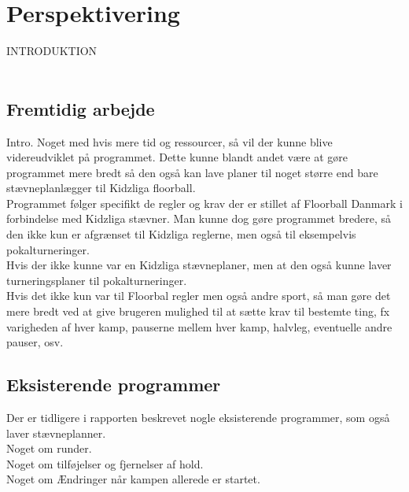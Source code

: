 \chapter{Perspektivering}\label{ch:chlabel}
INTRODUKTION
\\\\
\section*{Fremtidig arbejde}
Intro. Noget med hvis mere tid og ressourcer, så vil der kunne blive videreudviklet på programmet. Dette kunne blandt andet være at gøre programmet mere bredt så den også kan lave planer til noget større end bare  stævneplanlægger til Kidzliga floorball.
\\
Programmet følger specifikt de regler og krav der er stillet af Floorball Danmark i forbindelse med Kidzliga stævner. Man kunne dog gøre programmet bredere, så den ikke kun er afgrænset til Kidzliga reglerne, men også til eksempelvis pokalturneringer. 
\\
Hvis der ikke kunne var en Kidzliga stævneplaner, men at den også kunne laver turneringsplaner til pokalturneringer.
\\
Hvis det ikke kun var til Floorbal regler men også andre sport, så man gøre det mere bredt ved at give brugeren mulighed til at sætte krav til bestemte ting, fx varigheden af hver kamp, pauserne mellem hver kamp, halvleg, eventuelle andre pauser, osv.
\\

\section*{Eksisterende programmer}
Der er tidligere i rapporten beskrevet nogle eksisterende programmer, som også laver stævneplanner.
\\
Noget om runder.
\\
Noget om tilføjelser og fjernelser af hold.
\\
Noget om Ændringer når kampen allerede er startet.
\\